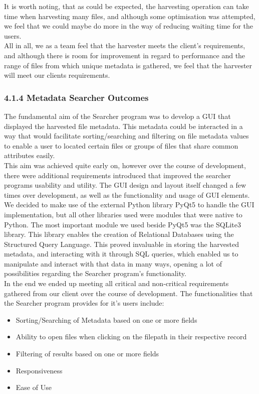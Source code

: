 \documentclass[11pt]{article}
\begin{document}
\begin{adjustwidth}{1cm}{}
It is worth noting, that as could be expected, the harvesting operation can take time when harvesting many files, and although some optimisation was attempted, we feel that we could maybe do more in the way of reducing waiting time for the users. \\

All in all, we as a team feel that the harvester meets the client’s requirements, and although there is room for improvement in regard to performance and the range of files from which unique metadata is gathered, we feel that the harvester will meet our clients requirements.


\subsubsection{4.1.4 Metadata Searcher Outcomes}
The fundamental aim of the Searcher program was to develop a GUI that displayed the harvested file metadata. This metadata could be interacted in a way that would facilitate sorting/searching and filtering on file metadata values to enable a user to located certain files or groups of files that share common attributes easily. \\

This aim was achieved quite early on, however over the course of development, there were additional requirements introduced that improved the searcher programs usability and utility. The GUI design and layout itself changed a few times over development, as well as the functionality and usage of GUI elements. \\

We decided to make use of the external Python library PyQt5 to handle the GUI implementation, but all other libraries used were modules that were native to Python. The most important module we used beside PyQt5 was the SQLite3 library. This library enables the creation of Relational Databases using the Structured Query Language. This proved invaluable in storing the harvested metadata, and interacting with it through SQL queries, which enabled us to manipulate and interact with that data in many ways, opening a lot of possibilities regarding the Searcher program’s functionality. \\

In the end we ended up meeting all critical and non-critical requirements gathered from our client over the course of development. The functionalities that the Searcher program provides for it’s users include:

\begin{itemize}
\item Sorting/Searching of Metadata based on one or more fields
\item Ability to open files when clicking on the filepath in their respective record
\item Filtering of results based on one or more fields
\item Responsiveness
\item Ease of Use
\end{itemize}


\end{adjustwidth}
\end{document}
